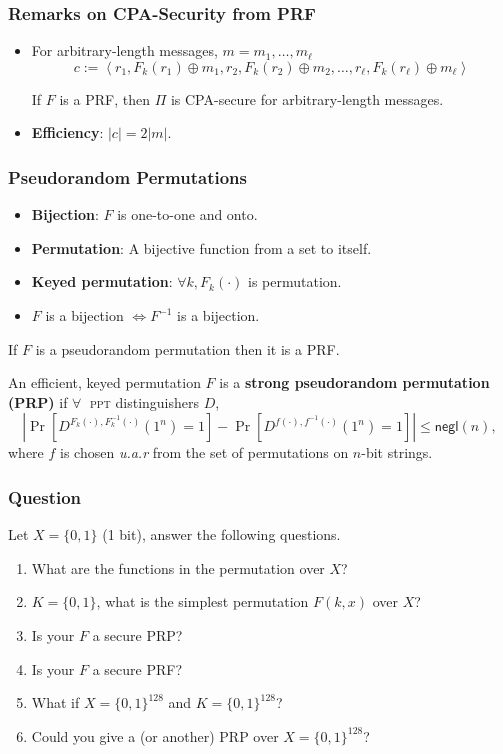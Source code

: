 \begin{frame}\frametitle{Remarks on CPA-Security from PRF}
\begin{itemize}
\item For arbitrary-length messages, $m = m_1, \dots , m_{\ell}$
\[ c := \left< r_1, F_k(r_1) \oplus m_1, r_2, F_k(r_2) \oplus m_2, \dots, r_\ell, F_k(r_\ell) \oplus m_\ell\right>
\]
\begin{corollary}
If $F$ is a PRF, then $\Pi$ is CPA-secure for arbitrary-length messages.
\end{corollary}
\item \textbf{Efficiency}: $|c| = 2|m|$. 
\end{itemize}
\end{frame}
\begin{frame}\frametitle{Pseudorandom Permutations}
\begin{itemize}
\item \textbf{Bijection}: $F$ is one-to-one and onto.
\item \textbf{Permutation}: A bijective function from a set to itself.
\item \textbf{Keyed permutation}: $\forall k, F_k(\cdot)$ is permutation.
\item $F$ is a bijection $\iff F^{-1}$ is a bijection.
\end{itemize}
\begin{proposition}
If $F$ is a pseudorandom permutation then it is a PRF.
\end{proposition}
\begin{definition}
An efficient, keyed permutation $F$ is a \textbf{strong pseudorandom permutation (PRP)} if
$\forall\;$ \textsc{ppt} distinguishers $D$,
\[ \left|\Pr[D^{F_k(\cdot),F_k^{-1}(\cdot)}(1^n)=1] - \Pr[D^{f(\cdot),f^{-1}(\cdot)}(1^n)=1]\right| \le \mathsf{negl}(n),
\]
where $f$ is chosen \emph{u.a.r} from the set of permutations on $n$-bit strings.
\end{definition}
\end{frame}
\begin{frame}\frametitle{Question}
\begin{exampleblock}{Let $X = \{ 0,1\}$ (1 bit), answer the following questions.}
\begin{enumerate}
\item What are the functions in the permutation over $X$?
\item $K = \{0, 1\}$, what is the simplest permutation $F(k, x)$ over $X$? 
\item Is your $F$ a secure PRP?
\item Is your $F$ a secure PRF?
\item What if $X = \{ 0,1\}^{128}$ and $K = \{0, 1\}^{128}$?
\item Could you give a (or another) PRP over $X = \{ 0,1\}^{128}$?
\end{enumerate}
\end{exampleblock}
\end{frame}

